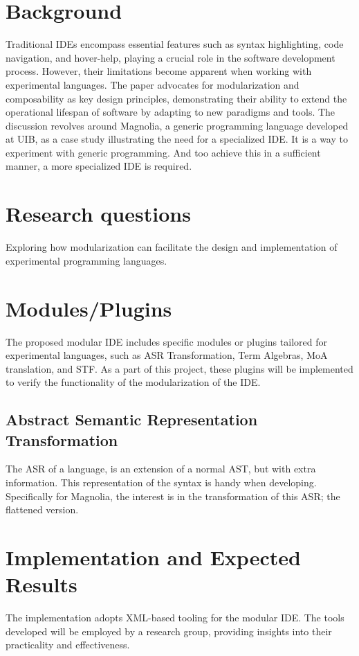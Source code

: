 \documentclass[runningheads]{llncs}
\begin{document}
\section{Background}

Traditional IDEs encompass essential features such as syntax highlighting, code navigation, and hover-help, playing a crucial role in the software development process. However, their limitations become apparent when working with experimental languages. The paper advocates for modularization and composability as key design principles, demonstrating their ability to extend the operational lifespan of software by adapting to new paradigms and tools.
The discussion revolves around Magnolia, a generic programming language developed at UIB, as a case study illustrating the need for a specialized IDE. It is a way to experiment with generic programming. And too achieve this in a sufficient manner, a more specialized IDE is required.

\section{Research questions} 

Exploring how modularization can facilitate the design and implementation of experimental programming languages.

\section{Modules/Plugins}

The proposed modular IDE includes specific modules or plugins tailored for experimental languages, such as ASR Transformation, Term Algebras, MoA translation, and STF. As a part of this project, these plugins will be implemented to verify the functionality of the modularization of the IDE.

\subsection{Abstract Semantic Representation Transformation}

The ASR of a language, is an extension of a normal AST, but with extra information. This representation of the syntax is handy when developing. Specifically for Magnolia, the interest is in the transformation of this ASR; the flattened version.  


\section{Implementation and Expected Results}

The implementation adopts XML-based tooling for the modular IDE. The tools developed will be employed by a research group, providing insights into their practicality and effectiveness.
\end{document}
